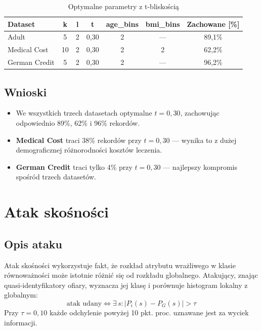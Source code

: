 \documentclass[12pt,a4paper]{article}
\begin{document}
\begin{table}[H]
\centering
\caption{Optymalne parametry z t-bliskością}
\begin{tabular}{lcccccc}
\toprule
\textbf{Dataset} & \textbf{k} & \textbf{l} & \textbf{t} & \textbf{age\_bins} & \textbf{bmi\_bins} & \textbf{Zachowane [\%]} \\
\midrule
Adult         & 5  & 2 & 0{,}30 & 2 & ---  & 89{,}1\% \\
Medical Cost  & 10 & 2 & 0{,}30 & 2 & 2    & 62{,}2\% \\
German Credit & 5  & 2 & 0{,}30 & 2 & ---  & 96{,}2\% \\
\bottomrule
\end{tabular}
\end{table}

\subsection{Wnioski}

\begin{itemize}
    \item We wszystkich trzech datasetach optymalne $t = 0{,}30$,
          zachowując odpowiednio 89\%, 62\% i 96\% rekordów.
    \item \textbf{Medical Cost} traci 38\% rekordów przy $t=0{,}30$ ---
          wynika to z dużej demograficznej różnorodności kosztów leczenia.
    \item \textbf{German Credit} traci tylko 4\% przy $t=0{,}30$ ---
          najlepszy kompromis spośród trzech datasetów.
\end{itemize}

\section{Atak skośności }

\subsection{Opis ataku}

Atak skośności wykorzystuje fakt, że rozkład atrybutu wrażliwego
w klasie równoważności może istotnie różnić się od rozkładu globalnego.
Atakujący, znając quasi-identyfikatory ofiary, wyznacza jej klasę
i porównuje histogram lokalny z globalnym:
\[
    \text{atak udany} \iff \exists\, s \colon |P_i(s) - P_G(s)| > \tau
\]
Przy $\tau = 0{,}10$ każde odchylenie powyżej 10 pkt. proc.
uznawane jest za wyciek informacji.
\end{document}
